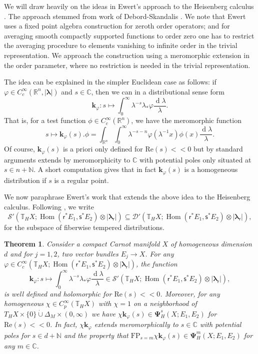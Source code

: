 \documentclass[a4paper,reqno]{amsart}
\numberwithin{equation}{section}
\def\Hom{\operatorname{Hom}}
\def\rd{\operatorname{d}\!}
\def\C{\mathbb{C}}
\def\R{\mathbb{R}}
\def\N{\mathbb{N}}
\def\T{\mathbb{T}}
\newtheorem{thm}{Theorem}[section]
\theoremstyle{definition}
\theoremstyle{remark}
\begin{document}
We will draw heavily on the ideas in Ewert's approach to the Heisenberg calculus \cite{ewertthesis, ewertfixed}. The approach stemmed from work of Debord-Skandalis \cite{debordskandav}. We note that Ewert \cite{ewertthesis, ewertfixed} uses a fixed point algebra construction for zeroth order operators; and for averaging smooth compactly supported functions to order zero one has to restrict the averaging procedure to elements vanishing to infinite order in the trivial representation. We approach the construction using a meromorphic extension in the order parameter, where no restriction is needed in the trivial representation. 

The idea can be explained in the simpler Euclidean case as follows: if $\varphi\in C^\infty_c(\R^n,|\pmb{\lambda}|)$ and $s\in \C$, then we can in a distributional sense form 
$$\pmb{k}_{\varphi}:s\mapsto \int_0^\infty \lambda^{-s}\lambda_*\varphi \frac{\rd \lambda}{\lambda}.$$
That is, for a test function $\phi\in C^\infty_c(\R^n)$, we have the meromorphic function
$$s\mapsto \pmb{k}_{\varphi}(s).\phi=\int_{\R^n}\int_0^\infty \lambda^{-s-n}\varphi(\lambda^{-1} x)\phi(x) \frac{\rd \lambda}{\lambda}.$$
Of course, $\pmb{k}_{\varphi}(s)$ is a priori only defined for $\mathrm{Re}(s)<<0$ but by standard arguments \cite[Chapter 3]{horI} extends by meromorphicity to $\C$ with potential poles only situated at $s\in n+\N$. A short computation gives that in fact $\pmb{k}_{\varphi}(s)$ is a homogeneous distribution if $s$ is a regular point. 

We now paraphrase Ewert's work \cite{ewertthesis, ewertfixed} that extends the above idea to the Heisenberg calculus. Following \cite[Chapter 9]{ewertthesis}, we write 
$$\mathcal{S}'(\T_HX; \Hom(\mathsf{r}^*E_1,\mathsf{s}^*E_2)\otimes |\pmb{\lambda}_\mathsf{r}|)\subseteq \mathcal{D}'(\T_HX; \Hom(\mathsf{r}^*E_1,\mathsf{s}^*E_2)\otimes |\pmb{\lambda}_\mathsf{r}|),$$ 
for the subspace of fiberwise tempered distributions.

\begin{thm}
\label{lknlknadthm}
Consider a compact Carnot manifold $X$ of homogeneous dimension $d$ and for $j=1,2$, two vector bundles $E_j\to X$. For any $\varphi\in C^\infty_c(\T_HX; \Hom(\mathsf{r}^*E_1,\mathsf{s}^*E_2)\otimes |\pmb{\lambda}_\mathsf{r}|)$, the function 
\begin{equation}
\label{kphiforgen}
\pmb{k}_{\varphi}:s\mapsto \int_0^\infty \lambda^{-s}\lambda_*\varphi \frac{\rd \lambda}{\lambda}\in \mathcal{S}'(\T_HX; \Hom(\mathsf{r}^*E_1,\mathsf{s}^*E_2)\otimes |\pmb{\lambda}_\mathsf{r}|),
\end{equation}
is well defined and holomorphic for $\mathrm{Re}(s)<<0$. Moreover, for any homogeneous $\chi\in C^\infty_p(\T_HX)$ with $\chi=1$ on a neighborhood of $T_HX\times \{0\}\dot{\cup}\Delta_M\times (0,\infty)$ we have $\chi\pmb{k}_{\varphi}(s)\in \pmb{\Psi}^s_H(X;E_1,E_2)$ for $\mathrm{Re}(s)<<0$. In fact, $\chi\pmb{k}_{\varphi}$ extends meromorphically to $s\in \C$ with potential poles for $s\in d+\N$ and the property that $\mathrm{FP}_{s=m}\chi\pmb{k}_{\varphi}(s)\in \pmb{\Psi}^m_H(X;E_1,E_2)$ for any $m\in \C$. 
\end{thm}
\end{document}
